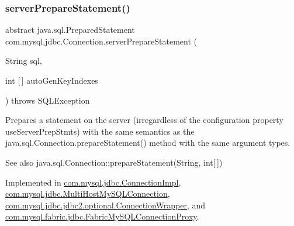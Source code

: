 \subsubsection{\texorpdfstring{server\+Prepare\+Statement()}{serverPrepareStatement()}\hspace{0.1cm}{\footnotesize\ttfamily [5/6]}}
{\footnotesize\ttfamily abstract java.\+sql.\+Prepared\+Statement com.\+mysql.\+jdbc.\+Connection.\+server\+Prepare\+Statement (\begin{DoxyParamCaption}\item[{String}]{sql,  }\item[{int \mbox{[}$\,$\mbox{]}}]{auto\+Gen\+Key\+Indexes }\end{DoxyParamCaption}) throws S\+Q\+L\+Exception\hspace{0.3cm}{\ttfamily [abstract]}}

Prepares a statement on the server (irregardless of the configuration property \textquotesingle{}use\+Server\+Prep\+Stmts\textquotesingle{}) with the same semantics as the java.\+sql.\+Connection.\+prepare\+Statement() method with the same argument types.

\begin{DoxySeeAlso}{See also}
java.\+sql.\+Connection\+::prepare\+Statement(\+String, int\mbox{[}$\,$\mbox{]}) 
\end{DoxySeeAlso}


Implemented in \mbox{\hyperlink{classcom_1_1mysql_1_1jdbc_1_1_connection_impl_a47beacf4b3a8a745c22fb6f1cd7b8e60}{com.\+mysql.\+jdbc.\+Connection\+Impl}}, \mbox{\hyperlink{classcom_1_1mysql_1_1jdbc_1_1_multi_host_my_s_q_l_connection_a62feb6ab7216c441bae377f5b7c738ac}{com.\+mysql.\+jdbc.\+Multi\+Host\+My\+S\+Q\+L\+Connection}}, \mbox{\hyperlink{classcom_1_1mysql_1_1jdbc_1_1jdbc2_1_1optional_1_1_connection_wrapper_a4625dbf11fc977f96a2da25c00c2a396}{com.\+mysql.\+jdbc.\+jdbc2.\+optional.\+Connection\+Wrapper}}, and \mbox{\hyperlink{classcom_1_1mysql_1_1fabric_1_1jdbc_1_1_fabric_my_s_q_l_connection_proxy_a023b1e89c0984415dfad1c569194eff9}{com.\+mysql.\+fabric.\+jdbc.\+Fabric\+My\+S\+Q\+L\+Connection\+Proxy}}.

\mbox{\label{interfacecom_1_1mysql_1_1jdbc_1_1_connection_a7bbac014ef6bb3ad113c039f71af4bd9}} 
